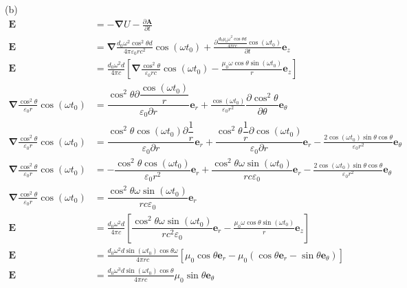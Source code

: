 (b)
\begin{align*}
    \boldsymbol{E}&=-\boldsymbol{\nabla}U-\frac{\partial \boldsymbol{A}}{\partial t}\\
    \boldsymbol{E}&=\boldsymbol{\nabla}\frac{d_0\omega^2\cos^2\theta d}{4\pi\varepsilon_0rc^2}
    \cos\left(\omega t_0\right)+\frac{\partial \frac{d_0\mu_0\omega^2\cos\theta d}{4\pi rc}
    \cos\left(\omega t_0\right)}{\partial t}\boldsymbol{e}_z\\
    \boldsymbol{E}&=\frac{d_0\omega^2d}{4\pi c}\left[\boldsymbol{\nabla}\frac{\cos^2\theta }{\varepsilon_0rc}
    \cos\left(\omega t_0\right)
    -\frac{\mu_0\omega\cos\theta
    \sin\left(\omega t_0\right)}{r}\boldsymbol{e}_z\right]\\
    \boldsymbol{\nabla}\frac{\cos^2\theta }{\varepsilon_0r}
    \cos\left(\omega t_0\right)
    &=\dfrac{\cos^2\theta\partial \dfrac{\cos\left(\omega t_0\right)}{r}
    }{\varepsilon_0\partial r}\boldsymbol{e}_r
    +\frac{\cos\left(\omega t_0\right)}{\varepsilon_0r^2}\dfrac{\partial \cos^2\theta 
    }{\partial \theta}\boldsymbol{e}_\theta\\
    \boldsymbol{\nabla}\frac{\cos^2\theta }{\varepsilon_0r}
    \cos\left(\omega t_0\right)
    &=\dfrac{\cos^2\theta\cos\left(\omega t_0\right)\partial \dfrac{1}{r}
    }{\varepsilon_0\partial r}\boldsymbol{e}_r
    +\dfrac{\cos^2\theta\dfrac{1}{r}\partial \cos\left(\omega t_0\right)
    }{\varepsilon_0\partial r}\boldsymbol{e}_r
    -\frac{2\cos\left(\omega t_0\right)\sin\theta\cos\theta}{\varepsilon_0r^2}\boldsymbol{e}_\theta\\
    \boldsymbol{\nabla}\frac{\cos^2\theta }{\varepsilon_0r}
    \cos\left(\omega t_0\right)
    &=-\dfrac{\cos^2\theta\cos\left(\omega t_0\right)
    }{\varepsilon_0r^2}\boldsymbol{e}_r
    +\dfrac{\cos^2\theta\omega\sin\left(\omega t_0\right)
    }{rc\varepsilon_0}\boldsymbol{e}_r
    -\frac{2\cos\left(\omega t_0\right)\sin\theta\cos\theta}{\varepsilon_0r^2}\boldsymbol{e}_\theta\\
    \boldsymbol{\nabla}\frac{\cos^2\theta }{\varepsilon_0r}
    \cos\left(\omega t_0\right)
    &=\dfrac{\cos^2\theta\omega\sin\left(\omega t_0\right)
    }{rc\varepsilon_0}\boldsymbol{e}_r\\
    \boldsymbol{E}&=\frac{d_0\omega^2d}{4\pi c}\left[\dfrac{\cos^2\theta\omega\sin\left(\omega t_0\right)
    }{rc^2\varepsilon_0}\boldsymbol{e}_r
    -\frac{\mu_0\omega\cos\theta
    \sin\left(\omega t_0\right)}{r}\boldsymbol{e}_z\right]\\
    \boldsymbol{E}&=\frac{d_0\omega^2d\sin\left(\omega t_0\right)\cos\theta\omega}{4\pi rc}\left[\mu_0\cos\theta
    \boldsymbol{e}_r
    -\mu_0 \left(\cos\theta{\boldsymbol{e}_r} -\sin\theta{\boldsymbol{e}_\theta} \right)\right]\\
    \boldsymbol{E}&=\frac{d_0\omega^3d\sin\left(\omega t_0\right)\cos\theta}{4\pi rc}\mu_0\sin\theta{\boldsymbol{e}_\theta}
\end{align*}
